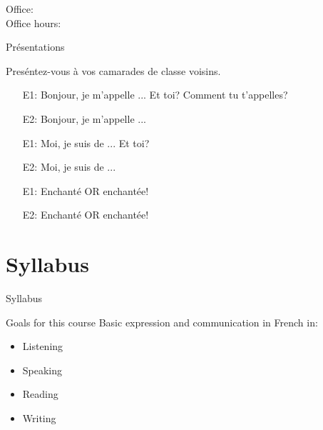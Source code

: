 \documentclass{beamer}
\subtitle[Bienvenue]{Bienvenue}
\begin{document}
  \begin{frame}
    \titlepage
    \tiny{Office: \\
          Office hours: }
  \end{frame}

  \begin{frame}{Présentations}
    \begin{center}
      Preséntez-vous à vos camarades de classe voisins.\\
    \end{center}
    \begin{itemize}
      \item[E1:] Bonjour, je m'appelle ... Et toi? Comment tu t'appelles?
      \item[E2:] Bonjour, je m'appelle ...
      \item[E1:] Moi, je suis de ... Et toi?
      \item[E2:] Moi, je suis de ...
      \item[E1:] Enchanté OR enchantée!
      \item[E2:] Enchanté OR enchantée!
    \end{itemize}
  \end{frame}

  \section{Syllabus}
  \begin{frame}
    \begin{center}
      \Huge{Syllabus}
    \end{center}
  \end{frame}

  \begin{frame}{Goals for this course}
    Basic expression and communication in French in:
    \begin{itemize}
      \item Listening
      \item Speaking
      \item Reading
      \item Writing
    \end{itemize}
  \end{frame}
\end{document}
